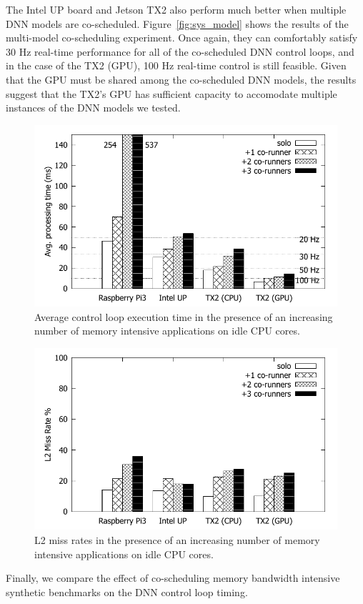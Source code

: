 The Intel UP board and Jetson TX2 also perform much better when multiple DNN models
are co-scheduled. Figure~\ref{fig:sys_model} shows the results of the
multi-model co-scheduling experiment. Once again, they can comfortably
satisfy 30 Hz real-time performance for all of the co-scheduled DNN control
loops, and in the case of the TX2 (GPU), 100 Hz real-time control is still
feasible. Given that the GPU must be shared among the co-scheduled DNN
models, the results suggest that the TX2's GPU has sufficient capacity to
accomodate multiple instances of the DNN models we tested.

\begin{figure}[h]
  \centering
  \includegraphics[width=.7\textwidth]{figs/compare_benchmark}
  \caption{Average control loop execution time in the presence of an
    increasing number of memory intensive applications on idle CPU cores.}
  \label{fig:sys_bench}
\end{figure} 

\begin{figure}[h]
  \centering
  \includegraphics[width=.7\textwidth]{figs/compare_l2missrate}
  \caption{L2 miss rates in the presence of an increasing number of 
			memory intensive applications on idle CPU cores.}
  \label{fig:sys_l2miss}
\end{figure}

Finally, we compare the effect of co-scheduling memory bandwidth
intensive synthetic benchmarks on the DNN control loop timing. 

